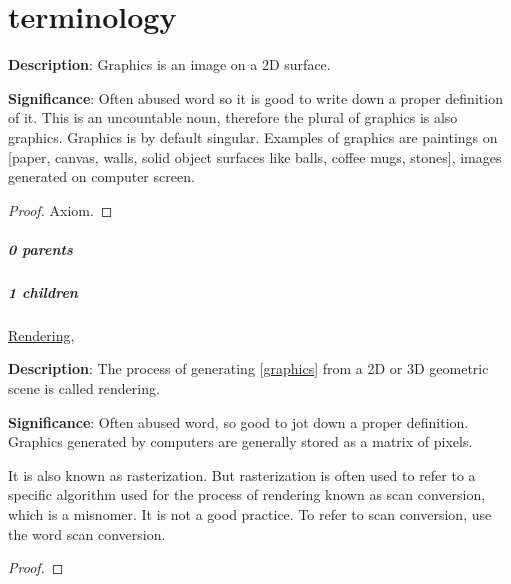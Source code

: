 \documentclass[./main.tex]{subfiles}
\begin{document}
\chapter{terminology}


\begin{statement}
\label{statement:Graphics}\hspace*{0pt}\par
\end{statement}
\textbf{Description}:
Graphics is an image on a 2D surface.
\par
{\color{magenta} \textbf{Significance}:
Often abused word so it is good to write down a proper definition of it.
This is an uncountable noun, therefore the plural of graphics is also graphics.
Graphics is by default singular.
Examples of graphics are paintings on [paper, canvas, walls, solid object surfaces like balls, coffee mugs, stones], images generated on computer screen.
\par}
\begin{proof}Axiom.\end{proof}\par
\paragraph{0 parents} 
\paragraph{1 children} \hyperref[statement:Rendering]{Rendering}, 



\begin{statement}
\label{statement:Rendering}\hspace*{0pt}\par
\end{statement}
\textbf{Description}:
The process of generating [\hyperref[statement:Graphics]{graphics}] from a 2D or 3D geometric scene is called rendering.
\par
{\color{magenta} \textbf{Significance}:
Often abused word, so good to jot down a proper definition.
Graphics generated by computers are generally stored as a matrix of pixels.

It is also known as rasterization.
But rasterization is often used to refer to a specific algorithm used for the process of rendering known as scan conversion, which is a misnomer.
It is not a good practice.
To refer to scan conversion, use the word scan conversion.
\par}
\begin{proof}
\proofbydefinition
\end{proof}\par
\end{document}
